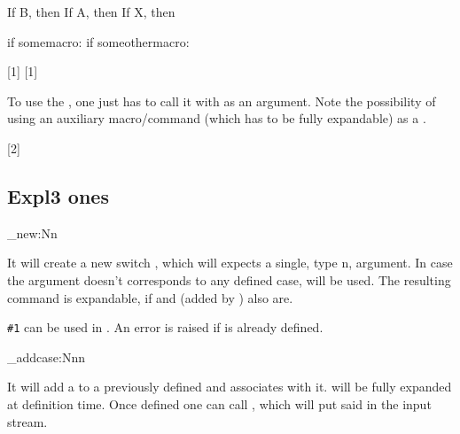 \documentclass[10pt]{article}
\begin{document}
\begin{codestore}[switch02]
\def\somemacro{case-A}
\def\someothermacro{case-X}

If B, then 
If A, then 
If X, then 

if somemacro: \myCase{\somemacro}
if someothermacro: \myCase{\someothermacro}
\end{codestore}

[1]
[1]

To use the , one just has to call it with  as an argument. Note the possibility of using an auxiliary macro/command (which has to be fully expandable) as a .

[2]


\subsection{Expl3 ones}
\begin{codedescribe}{\switch_new:Nn}
\begin{codesyntax}%
  
\end{codesyntax}
It will create a new switch , which will expects a single, type n, argument. In case the argument doesn't corresponds to any defined case,  will be used. The resulting  command is expandable, if  and  (added by ) also are. 
\end{codedescribe}
\begin{tsremark}
  \verb|#1| can be used in .  An error is raised if  is already defined.
\end{tsremark}

\begin{codedescribe}{\switch_addcase:Nnn}
\begin{codesyntax}%
  
\end{codesyntax}
It will add a  to a previously defined  and associates  with it.  will be fully expanded at definition time. Once defined one can call , which will put said  in the input stream. 
\end{codedescribe}
\end{document}

